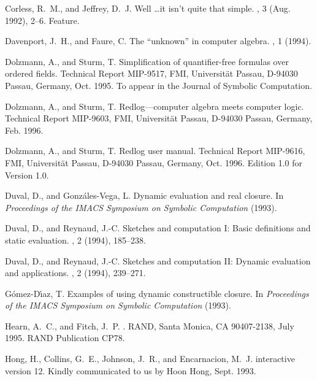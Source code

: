 \begin{thebibliography}{999}
{Corless, R.~M., and Jeffrey, D.~J.}
\newblock Well \dots it isn't quite that simple.
, 3 (Aug. 1992), 2--6.
\newblock Feature.

{Davenport, J.~H., and Faure, C.}
\newblock The ``unknown'' in computer algebra.
, 1 (1994).

{Dolzmann, A., and Sturm, T.}
\newblock Simplification of quan\-ti\-fier-free formulas over ordered fields.
\newblock Technical Report MIP-9517, FMI, Universit\"at Passau, D-94030 Passau,
  Germany, Oct. 1995.
\newblock To appear in the Journal of Symbolic Computation.

{Dolzmann, A., and Sturm, T.}
\newblock Redlog---computer algebra meets computer logic.
\newblock Technical Report MIP-9603, FMI, Universit\"at Passau, D-94030 Passau,
  Germany, Feb. 1996.

{Dolzmann, A., and Sturm, T.}
\newblock Redlog user manual.
\newblock Technical Report MIP-9616, FMI, Universit\"at Passau, D-94030 Passau,
  Germany, Oct. 1996.
\newblock Edition 1.0 for Version 1.0.

{Duval, D., and Gonz\'ales-Vega, L.}
\newblock Dynamic evaluation and real closure.
\newblock In {\em Proceedings of the IMACS Symposium on Symbolic Computation\/}
  (1993).

{Duval, D., and Reynaud, J.-C.}
\newblock Sketches and computation {I}: Basic definitions and static
  evaluation.
, 2 (1994),
  185--238.

{Duval, D., and Reynaud, J.-C.}
\newblock Sketches and computation {II}: Dynamic evaluation and applications.
, 2 (1994),
  239--271.

{G\'omez-D\'{\i}az, T.}
\newblock Examples of using dynamic constructible closure.
\newblock In {\em Proceedings of the IMACS Symposium on Symbolic Computation\/}
  (1993).

{Hearn, A.~C., and Fitch, J.~P.}
.
\newblock RAND, Santa Monica, CA 90407-2138, July 1995.
\newblock RAND Publication CP78.

{Hong, H., Collins, G.~E., Johnson, J.~R., and Encarnacion, M.~J.}
 interactive version 12.
\newblock Kindly communicated to us by Hoon Hong, Sept. 1993.


\end{thebibliography}
